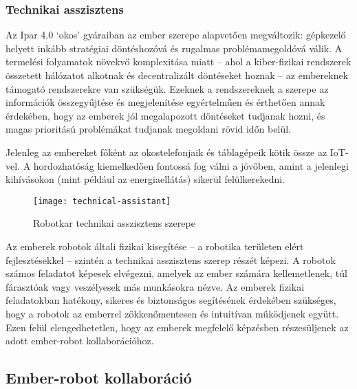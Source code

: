 \documentclass[../documentation.tex]{subfiles}
\begin{document}
\subsubsection{Technikai asszisztens}
Az Ipar 4.0 `okos' gyáraiban az ember szerepe alapvetően megváltozik: gépkezelő helyett inkább stratégiai döntéshozóvá és rugalmas problémamegoldóvá válik. A termelési folyamatok növekvő komplexitása miatt -- ahol a kiber-fizikai rendszerek összetett hálózatot alkotnak és decentralizált döntéseket hoznak -- az embereknek támogató rendszerekre van szükségük. Ezeknek a rendszereknek a szerepe az információk összegyűjtése és megjelenítése egyértelműen és érthetően annak érdekében, hogy az emberek jól megalapozott döntéseket tudjanak hozni, és magas prioritású problémákat tudjanak megoldani rövid időn belül.

Jelenleg az embereket főként az okostelefonjaik és táblagépeik kötik össze az IoT-vel\cite{fromiot2ioe}. A hordozhatóság kiemelkedően fontossá fog válni a jövőben, amint a jelenlegi kihívásokon (mint például az energiaellátás) sikerül felülkerekedni.

\begin{figure}[h]
\centering
\texttt{[image: technical-assistant]}
\caption{Robotkar technikai asszisztens szerepe\protect\footnotemark}
\label{fig:technical-assistant}
\end{figure}

Az emberek robotok általi fizikai kisegítése -- a robotika területen elért fejlesztésekkel -- szintén a technikai asszisztens szerep részét képezi. A robotok számos feladatot képesek elvégezni, amelyek az ember számára kellemetlenek, túl fárasztóak vagy veszélyesek más munkásokra nézve\cite{hri}. Az emberek fizikai feladatokban hatékony, sikeres és biztonságos segítésének érdekében szükséges, hogy a robotok az emberrel zökkenőmentesen és intuitívan működjenek együtt\cite{hri}. Ezen felül elengedhetetlen, hogy az emberek megfelelő képzésben részesüljenek az adott ember-robot kollaborációhoz\cite{m-learning}.

\subsection{Ember-robot kollaboráció}
\end{document}

